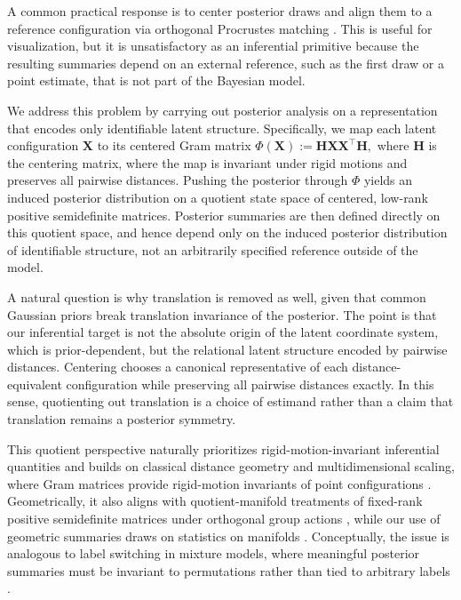 \documentclass[12pt]{article}
\newcommand{\bfH}{\boldsymbol{H}}
\newcommand{\bfX}{\boldsymbol{X}}
\begin{document}
A common practical response is to center posterior draws and align them to a reference
configuration via orthogonal Procrustes matching
\citep{hoff_2002_LatentSpaceApproaches, gower_2004_ProcrustesProblems}. This is useful for
visualization, but it is unsatisfactory as an inferential primitive because the resulting summaries
depend on an external reference, such as the first draw or a point estimate, that is not part of the
Bayesian model.

We address this problem by carrying out posterior analysis on a representation that encodes only
identifiable latent structure. Specifically, we map each latent configuration $\bfX$ to its centered
Gram matrix
$
\Phi(\bfX):=\bfH\bfX\bfX^\top\bfH,
$
where $\bfH$ is the centering matrix, where the map is invariant under rigid motions and preserves all
pairwise distances. Pushing the posterior through $\Phi$ yields an induced posterior distribution on
a quotient state space of centered, low-rank positive semidefinite matrices. Posterior summaries are
then defined directly on this quotient space, and hence depend only on the induced posterior
distribution of identifiable structure, not an arbitrarily specified reference outside of the model.

A natural question is why translation is removed as well, given that common Gaussian priors break
translation invariance of the posterior. The point is that our inferential target is not the
absolute origin of the latent coordinate system, which is prior-dependent, but the relational latent
structure encoded by pairwise distances. Centering chooses a canonical representative of each
distance-equivalent configuration while preserving all pairwise distances exactly. In this sense,
quotienting out translation is a choice of estimand rather than a claim that translation remains a
posterior symmetry.

This quotient perspective naturally prioritizes rigid-motion-invariant inferential quantities and
builds on classical distance geometry and multidimensional scaling, where Gram matrices provide
rigid-motion invariants of point configurations
\citep{gower_1969_MinimumSpanningTrees, borg_1997_ModernMultidimensionalScaling}. Geometrically,
it also aligns with quotient-manifold treatments of fixed-rank positive semidefinite matrices under
orthogonal group actions
\citep{absil_2008_OptimizationAlgorithmsMatrix, journee_2010_LowRankOptimizationCone, massart_2020_QuotientGeometrySimple},
while our use of geometric summaries draws on statistics on manifolds
\citep{bhattacharya_2012_NonparametricInferenceManifolds, patrangenaru_2016_NonparametricStatisticsManifolds, pennec_2020_RiemannianGeometricStatistics}. Conceptually, the issue is analogous to label switching in mixture models, where meaningful posterior summaries must be invariant to permutations rather than tied to arbitrary labels
\citep{celeux_2000_ComputationalInferentialDifficulties, stephens_2000_DealingLabelSwitching, jasra_2005_MarkovChainMonte}.
\end{document}
